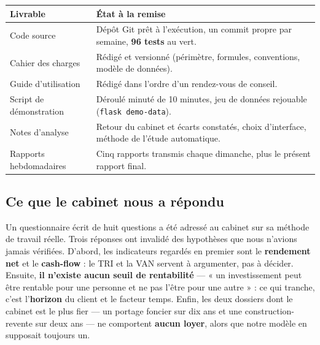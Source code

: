 \documentclass[11pt,a4paper]{article}
\begin{document}
\vspace{0.4cm}
\begin{table}[H]
	\centering
	\small
	\renewcommand{\arraystretch}{1.40}
	\begin{tabular}{|>{\raggedright\arraybackslash}p{4.5cm}|>{\raggedright\arraybackslash}p{10.5cm}|}
		\hline
		\rowcolor{eccblue!15}
		\textbf{\color{eccblue}Livrable} & \textbf{\color{eccblue}État à la remise} \\
		\hline
		\rowcolor{white}
		Code source & Dépôt Git prêt à l'exécution, un commit propre par semaine, \textbf{96 tests} au vert. \\
		\rowcolor{gray!8}
		Cahier des charges & Rédigé et versionné (périmètre, formules, conventions, modèle de données). \\
		\rowcolor{white}
		Guide d'utilisation & Rédigé dans l'ordre d'un rendez-vous de conseil. \\
		\rowcolor{gray!8}
		Script de démonstration & Déroulé minuté de 10 minutes, jeu de données rejouable (\texttt{flask demo-data}). \\
		\rowcolor{white}
		Notes d'analyse & Retour du cabinet et écarts constatés, choix d'interface, méthode de l'étude automatique. \\
		\rowcolor{gray!8}
		Rapports hebdomadaires & Cinq rapports transmis chaque dimanche, plus le présent rapport final. \\
		\hline
	\end{tabular}
\end{table}


\subsection{Ce que le cabinet nous a répondu}
Un questionnaire écrit de huit questions a été adressé au cabinet sur sa méthode de travail réelle. Trois réponses ont invalidé des hypothèses que nous n'avions jamais vérifiées. D'abord, les indicateurs regardés en premier sont le \textbf{rendement net} et le \textbf{cash-flow} : le TRI et la VAN servent à argumenter, pas à décider. Ensuite, \textbf{il n'existe aucun seuil de rentabilité} — « un investissement peut être rentable pour une personne et ne pas l'être pour une autre » : ce qui tranche, c'est l'\textbf{horizon} du client et le facteur temps. Enfin, les deux dossiers dont le cabinet est le plus fier — un portage foncier sur dix ans et une construction-revente sur deux ans — ne comportent \textbf{aucun loyer}, alors que notre modèle en supposait toujours un.
\end{document}
